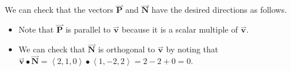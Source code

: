 \documentclass{ximera}
\begin{document}
\begin{exercise}
\begin{exercise}
 \begin{feedback}[correct] We can check that the vectors $\overset{\boldsymbol{\rightharpoonup}}{\mathbf{P}}$ and $\overset{\boldsymbol{\rightharpoonup}}{\mathbf{N}}$ have the desired directions as follows.
 \begin{itemize}
 \item  Note that $\overset{\boldsymbol{\rightharpoonup}}{\mathbf{P}}$ is parallel to $\overset{\boldsymbol{\rightharpoonup}}{\mathbf{v}}$ because it is a scalar multiple of $\overset{\boldsymbol{\rightharpoonup}}{\mathbf{v}}$. 
 \item We can check that $\overset{\boldsymbol{\rightharpoonup}}{\mathbf{N}}$ is orthogonal to $\overset{\boldsymbol{\rightharpoonup}}{\mathbf{v}}$ by noting that $\overset{\boldsymbol{\rightharpoonup}}{\mathbf{v}} \bullet \overset{\boldsymbol{\rightharpoonup}}{\mathbf{N}} =  \left< 2,1,0 \right> \bullet \left< 1,-2,2 \right> = 2-2+0=0.$
 \end{itemize}
 \end{feedback}
\end{exercise}
\end{exercise}
\end{document}
